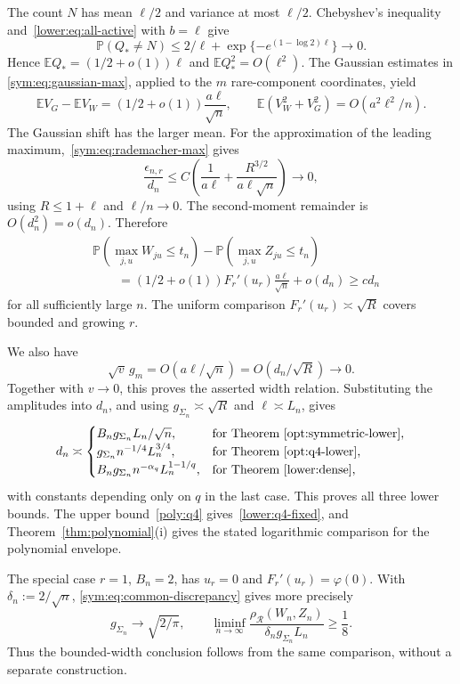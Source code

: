 \documentclass[11pt,letterpaper]{article}
\newenvironment{vSixBlock}{\color{magenta}}{}
\theoremstyle{remark}
\newcommand{\E}{\mathbb E}
\newcommand{\Pp}{\mathbb P}
\newcommand{\rh}{\rho_{\mathcal R}}
\begin{document}
\begin{vSixBlock}
The count \(N\) has mean \(\ell/2\) and variance at most
\(\ell/2\). Chebyshev's inequality and~\eqref{lower:eq:all-active}
with \(b=\ell\) give
\[
 \Pp(Q_*\ne N)\le 2/\ell+
 \exp\{-e^{(1-\log2)\ell}\}\to0.
\]
Hence \(\E Q_*=(1/2+o(1))\ell\) and
\(\E Q_*^2=O(\ell^2)\). The Gaussian estimates in
\eqref{sym:eq:gaussian-max}, applied to the \(m\) rare-component
coordinates, yield
\[
 \E V_G-\E V_W=(1/2+o(1))\frac{a\ell}{\sqrt n},\qquad
 \E(V_W^2+V_G^2)=O(a^2\ell^2/n).
\]
The Gaussian shift has the larger mean. For the approximation of the
leading maximum,~\eqref{sym:eq:rademacher-max} gives
\[
 \frac{\epsilon_{n,r}}{d_n}
 \le C\left(\frac1{a\ell}
       +\frac{R^{3/2}}{a\ell\sqrt n}\right)\to0,
\]
using \(R\le1+\ell\) and \(\ell/n\to0\).
The second-moment remainder is \(O(d_n^2)=o(d_n)\). Therefore
\begin{equation}
\begin{split}
 &\Pp(\max_{j,u}W_{ju}\le t_n)-\Pp(\max_{j,u}Z_{ju}\le t_n)\\
 &\qquad=(1/2+o(1))F_r'(u_r)\frac{a\ell}{\sqrt n}
          +o(d_n)\ge c d_n
\end{split}
 \label{sym:eq:common-discrepancy}
\end{equation}
for all sufficiently large \(n\). The uniform comparison
\(F_r'(u_r)\asymp\sqrt R\) covers bounded and growing \(r\).

We also have
\[
 \sqrt v\,g_m=O(a\ell/\sqrt n)=O(d_n/\sqrt R)\to0.
\]
Together with \(v\to0\), this proves the asserted width relation.
Substituting the amplitudes into \(d_n\), and using
\(g_{\Sigma_n}\asymp\sqrt R\) and \(\ell\asymp L_n\), gives
\[
 d_n\asymp
 \begin{cases}
 B_n g_{\Sigma_n}L_n/\sqrt n,
   &\text{for Theorem~\ref{opt:symmetric-lower}},\\
 g_{\Sigma_n}n^{-1/4}L_n^{3/4},
   &\text{for Theorem~\ref{opt:q4-lower}},\\
 B_n g_{\Sigma_n}n^{-\alpha_q}L_n^{1-1/q},
   &\text{for Theorem~\ref{lower:dense}},
 \end{cases}
\]
with constants depending only on \(q\) in the last case.
This proves all three lower bounds. The upper bound~\eqref{poly:q4}
gives~\eqref{lower:q4-fixed}, and
Theorem~\ref{thm:polynomial}\textup{(i)} gives the stated logarithmic
comparison for the polynomial envelope.

The special case \(r=1\), \(B_n=2\), has \(u_r=0\) and
\(F_r'(u_r)=\varphi(0)\). With \(\delta_n:=2/\sqrt n\),
\eqref{sym:eq:common-discrepancy} gives more precisely
\[
 g_{\Sigma_n}\to\sqrt{2/\pi},\qquad
 \liminf_{n\to\infty}
 \frac{\rh(W_n,Z_n)}{\delta_n g_{\Sigma_n}L_n}\ge\frac18.
\]
Thus the bounded-width conclusion follows from the same comparison,
without a separate construction.


\end{vSixBlock}
\end{document}

